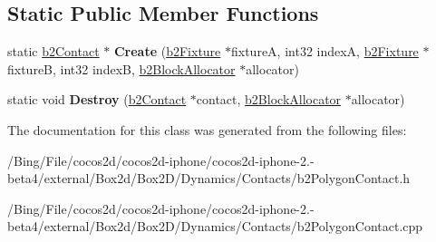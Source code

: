 \subsection*{Static Public Member Functions}
\begin{DoxyCompactItemize}
\item 
\hypertarget{classb2_polygon_contact_a65356af432d877838e14755c5eb3c553}{static \hyperlink{classb2_contact}{b2\-Contact} $\ast$ {\bfseries Create} (\hyperlink{classb2_fixture}{b2\-Fixture} $\ast$fixture\-A, int32 index\-A, \hyperlink{classb2_fixture}{b2\-Fixture} $\ast$fixture\-B, int32 index\-B, \hyperlink{classb2_block_allocator}{b2\-Block\-Allocator} $\ast$allocator)}\label{classb2_polygon_contact_a65356af432d877838e14755c5eb3c553}

\item 
\hypertarget{classb2_polygon_contact_a0cb55fd6af6f49d36c3cda15ffd96e63}{static void {\bfseries Destroy} (\hyperlink{classb2_contact}{b2\-Contact} $\ast$contact, \hyperlink{classb2_block_allocator}{b2\-Block\-Allocator} $\ast$allocator)}\label{classb2_polygon_contact_a0cb55fd6af6f49d36c3cda15ffd96e63}

\end{DoxyCompactItemize}


The documentation for this class was generated from the following files\-:\begin{DoxyCompactItemize}
\item 
/\-Bing/\-File/cocos2d/cocos2d-\/iphone/cocos2d-\/iphone-\/2.-\/beta4/external/\-Box2d/\-Box2\-D/\-Dynamics/\-Contacts/b2\-Polygon\-Contact.\-h\item 
/\-Bing/\-File/cocos2d/cocos2d-\/iphone/cocos2d-\/iphone-\/2.-\/beta4/external/\-Box2d/\-Box2\-D/\-Dynamics/\-Contacts/b2\-Polygon\-Contact.\-cpp\end{DoxyCompactItemize}
